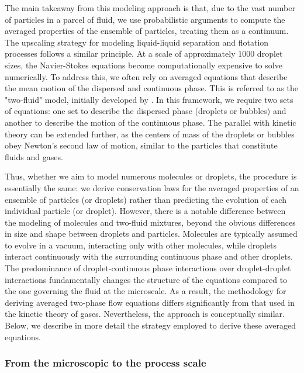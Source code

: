 The main takeaway from this modeling approach is that, due to the vast number of particles in a parcel of fluid, we use probabilistic arguments to compute the averaged properties of the ensemble of particles, treating them as a continuum.
The upscaling strategy for modeling liquid-liquid separation and flotation processes follows a similar principle.
At a scale of approximately $1000$ droplet sizes, the Navier-Stokes equations become computationally expensive to solve numerically.
To address this, we often rely on averaged equations that describe the mean motion of the dispersed and continuous phase.
This is referred to as the "two-fluid" model, initially developed by \citet{drew1983mathematical}.
In this framework, we require two sets of equations: one set to describe the dispersed phase (droplets or bubbles) and another to describe the motion of the continuous phase.
The parallel with kinetic theory can be extended further, as the centers of mass of the droplets or bubbles obey Newton's second law of motion, similar to the particles that constitute fluids and gases.


Thus, whether we aim to model numerous molecules or droplets, the procedure is essentially the same: we derive conservation laws for the averaged properties of an ensemble of particles (or droplets) rather than predicting the evolution of each individual particle (or droplet).
However, there is a notable difference between the modeling of molecules and two-fluid mixtures, beyond the obvious differences in size and shape between droplets and particles.
Molecules are typically assumed to evolve in a vacuum, interacting only with other molecules, while droplets interact continuously with the surrounding continuous phase and other droplets.
The predominance of droplet-continuous phase interactions over droplet-droplet interactions fundamentally changes the structure of the equations compared to the one governing the fluid at the microscale.
As a result, the methodology for deriving averaged two-phase flow equations differs significantly from that used in the kinetic theory of gases.
Nevertheless, the approach is conceptually similar.
Below, we describe in more detail the strategy employed to derive these averaged equations. 


\subsubsection{From the microscopic to the process scale}

